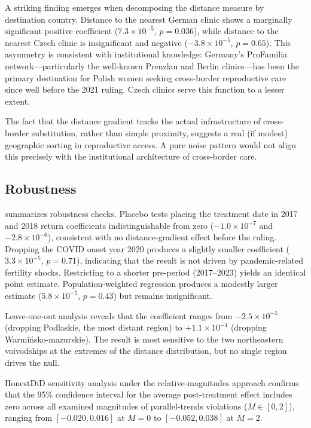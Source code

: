 \documentclass[12pt]{article}
\begin{document}
A striking finding emerges when decomposing the distance measure by destination country. Distance to the nearest German clinic shows a marginally significant positive coefficient ($7.3 \times 10^{-5}$, $p = 0.036$), while distance to the nearest Czech clinic is insignificant and negative ($-3.8 \times 10^{-5}$, $p = 0.65$). This asymmetry is consistent with institutional knowledge: Germany's ProFamilia network---particularly the well-known Prenzlau and Berlin clinics---has been the primary destination for Polish women seeking cross-border reproductive care since well before the 2021 ruling. Czech clinics serve this function to a lesser extent.

The fact that the distance gradient tracks the actual infrastructure of cross-border substitution, rather than simple proximity, suggests a real (if modest) geographic sorting in reproductive access. A pure noise pattern would not align this precisely with the institutional architecture of cross-border care.

\subsection{Robustness}



 summarizes robustness checks. Placebo tests placing the treatment date in 2017 and 2018 return coefficients indistinguishable from zero ($-1.0 \times 10^{-7}$ and $-2.8 \times 10^{-6}$), consistent with no distance-gradient effect before the ruling. Dropping the COVID onset year 2020 produces a slightly smaller coefficient ($3.3 \times 10^{-5}$, $p = 0.71$), indicating that the result is not driven by pandemic-related fertility shocks. Restricting to a shorter pre-period (2017--2023) yields an identical point estimate. Population-weighted regression produces a modestly larger estimate ($5.8 \times 10^{-5}$, $p = 0.43$) but remains insignificant.

Leave-one-out analysis reveals that the coefficient ranges from $-2.5 \times 10^{-5}$ (dropping Podlaskie, the most distant region) to $+1.1 \times 10^{-4}$ (dropping Warmi\'{n}sko-mazurskie). The result is most sensitive to the two northeastern voivodships at the extremes of the distance distribution, but no single region drives the null.

HonestDiD sensitivity analysis under the relative-magnitudes approach \citep{rambachan2023} confirms that the 95\% confidence interval for the average post-treatment effect includes zero across all examined magnitudes of parallel-trends violations ($\overline{M} \in [0, 2]$), ranging from $[-0.020, 0.016]$ at $\overline{M} = 0$ to $[-0.052, 0.038]$ at $\overline{M} = 2$.
\end{document}
